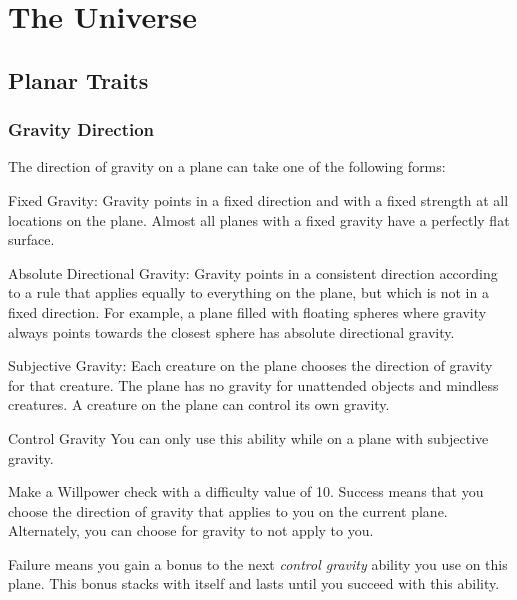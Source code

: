 \chapter{The Universe}

\section{Planar Traits}
  \subsection{Gravity Direction}
    The direction of gravity on a plane can take one of the following forms:
    \begin{raggeditemize}
      \item Fixed Gravity: Gravity points in a fixed direction and with a fixed strength at all locations on the plane.
        Almost all planes with a fixed gravity have a perfectly flat surface.
      \item Absolute Directional Gravity: Gravity points in a consistent direction according to a rule that applies equally to everything on the plane, but which is not in a fixed direction.
        For example, a plane filled with floating spheres where gravity always points towards the closest sphere has absolute directional gravity.
      \item Subjective Gravity: Each creature on the plane chooses the direction of gravity for that creature.
        The plane has no gravity for unattended objects and mindless creatures.
        A creature on the plane can control its own gravity.
        \begin{activeability}{Control Gravity}{}
          \rankline
          You can only use this ability while on a plane with subjective gravity.

          Make a Willpower check with a difficulty value of 10.
          Success means that you choose the direction of gravity that applies to you on the current plane.
          Alternately, you can choose for gravity to not apply to you.

          Failure means you gain a  bonus to the next \textit{control gravity} ability you use on this plane.
          This bonus stacks with itself and lasts until you succeed with this ability.
        \end{activeability}
    \end{raggeditemize}

